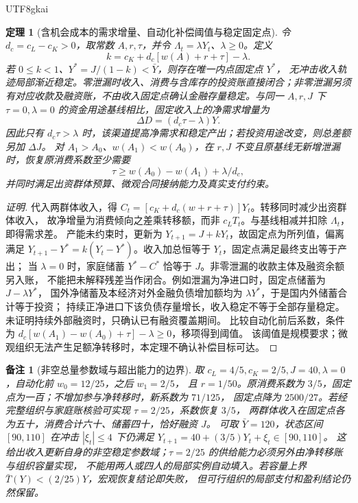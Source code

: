 \documentclass[12pt,a4paper,openany]{report}
\newtheorem{theorem}{定理}[chapter]
\newtheorem{remark}{备注}[chapter]
\begin{document}
\begin{CJK*}{UTF8}{gkai}
\begin{theorem}[含机会成本的需求增量、自动化补偿阈值与稳定固定点]
\label{thm:aggregate-demand-closure}
令 \(d_c=c_L-c_K>0\)，取常数 \(A,r,\tau\)，并令 \(\Lambda_t=\lambda Y_t\)、\(\lambda\ge0\)。定义
\[
 k=c_K+d_c[w(A)+r+\tau]-\lambda.
\]
若 \(0\le k<1\)、\(Y^*=J/(1-k)<\bar Y\)，则存在唯一内点固定点 \(Y^*\)，
无冲击收入轨迹局部渐近稳定。零泄漏时收入、消费与含库存的投资账直接闭合；非零泄漏另须有对应收款及融资账，不由收入固定点确认金融存量稳定。与同一 \(A,r,J\) 下
\(\tau=0,\lambda=0\) 的资金用途基线相比，固定收入上的净需求增量为
\[
 \Delta D=(d_c\tau-\lambda)Y.
\]
因此只有 \(d_c\tau>\lambda\) 时，该渠道提高净需求和稳定产出；若投资用途改变，则总差额另加 \(\Delta J\)。
对 \(A_1>A_0\)、\(w(A_1)<w(A_0)\)，在 \(r,J\) 不变且原基线无新增泄漏时，恢复原消费系数至少需要
\[
 \tau\ge w(A_0)-w(A_1)+\lambda/d_c,
\]
并同时满足出资群体预算、微观合同接纳能力及真实支付约束。
\end{theorem}
\begin{proof}[证明]
代入两群体收入，得 \(C_t=[c_K+d_c(w+r+\tau)]Y_t\)。转移同时减少出资群体收入，
故净增量为消费倾向之差乘转移额，而非 \(c_L T_t\)。与基线相减并扣除 \(\Lambda_t\)，即得需求差。
产能未约束时，更新为 \(Y_{t+1}=J+kY_t\)，故固定点为所列值，偏离满足
\(Y_{t+1}-Y^*=k(Y_t-Y^*)\)。收入加总恒等于 \(Y_t\)，固定点满足最终支出等于产出；
当 \(\lambda=0\) 时，家庭储蓄 \(Y^*-C^*\) 恰等于 \(J\)。非零泄漏的收款主体及融资余额另入账，
不能把未解释残差当作闭合。例如泄漏为净进口时，固定点储蓄为 \(J-\lambda Y^*\)，
国外净储蓄及本经济对外金融负债增加额均为 \(\lambda Y^*\)，于是国内外储蓄合计等于投资；
持续正净进口下该负债存量增长，收入稳定不等于全部存量稳定。未证明持续外部融资时，只确认已有融资覆盖期间。
比较自动化前后系数，条件为
\(d_c[w(A_1)-w(A_0)+\tau]-\lambda\ge0\)，移项得到阈值。
该阈值是规模要求；微观组织无法产生足额净转移时，本定理不确认补偿目标可达。
\end{proof}

\begin{remark}[非空总量参数域与超出能力的边界]
取 \(c_L=4/5,c_K=2/5,J=40,\lambda=0\)，自动化前 \(w_0=12/25\)，之后 \(w_1=2/5\)，
且 \(r=1/50\)。原消费系数为 \(3/5\)，固定点为一百；不增加参与净转移时，新系数为 \(71/125\)，
固定点降为 \(2500/27\)。若经完整组织与家庭账核验可实现 \(\tau=2/25\)，系数恢复 \(3/5\)，
两群体收入在固定点各为五十，消费合计六十、储蓄四十，恰好融资 \(J\)。
可取 \(\bar Y=120\)，状态区间 \([90,110]\) 在冲击 \(|\xi_t|\le4\) 下仍满足
\(Y_{t+1}=40+(3/5)Y_t+\xi_t\in[90,110]\)。
这给出收入更新自身的非空稳定参数域；\(\tau=2/25\) 的供给能力必须另外由净转移账与组织容量实现，
不能用两人或四人的局部实例自动填入。若容量上界 \(\bar T(Y)<(2/25)Y\)，宏观恢复结论即失败，
但可行组织的局部支付和盈利结论仍然保留。
\end{remark}


\end{CJK*}
\end{document}
